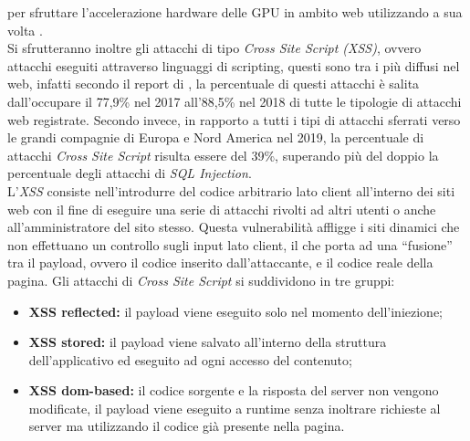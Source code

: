 \documentclass[
11pt, %
oneside, %
italian, %
onehalfspacing,%
headsepline, %
]{MastersDoctoralThesis} %
\newcommand\citen[1]{\citeauthor{#1} \citep{#1}}
\begin{document}
per sfruttare l'accelerazione hardware delle GPU in ambito web utilizzando a sua volta .\\
Si sfrutteranno inoltre gli attacchi di tipo \emph{Cross Site Script (XSS)}, ovvero attacchi eseguiti attraverso linguaggi di scripting, questi sono tra i più diffusi nel web, infatti secondo il report di \citen{PositiveTechnologiesReport}, la percentuale di questi attacchi è salita dall'occupare il 77,9\% nel 2017 all'88,5\% nel 2018 di tutte le tipologie di attacchi web registrate. Secondo \citen{PreciseSecurityReport} invece, in rapporto a tutti i tipi di attacchi sferrati verso le grandi compagnie di Europa e Nord America nel 2019, la percentuale di attacchi \emph{Cross Site Script} risulta essere del 39\%, superando più del doppio la percentuale degli attacchi di \emph{SQL Injection}.\\
L'\emph{XSS} consiste nell’introdurre del codice arbitrario lato client all'interno dei siti web con il fine di eseguire una serie di attacchi rivolti ad altri utenti o anche all'amministratore del sito stesso. Questa vulnerabilità affligge i siti dinamici che non effettuano un controllo sugli input lato client, il che porta ad una ``fusione'' tra il payload, ovvero il codice inserito dall'attaccante, e il codice reale della pagina. Gli attacchi di \emph{Cross Site Script} si suddividono in tre gruppi:
\begin{itemize}
  \item\textbf{XSS reflected:} il payload viene eseguito solo nel momento dell’iniezione;
  \item\textbf{XSS stored:} il payload viene salvato all'interno della struttura dell'applicativo ed eseguito ad ogni accesso del contenuto;
  \item\textbf{XSS dom-based:} il codice sorgente e la risposta del server non vengono modificate, il payload viene eseguito a runtime senza inoltrare richieste al server ma utilizzando il codice già presente nella pagina.
\end{itemize}
\end{document}
